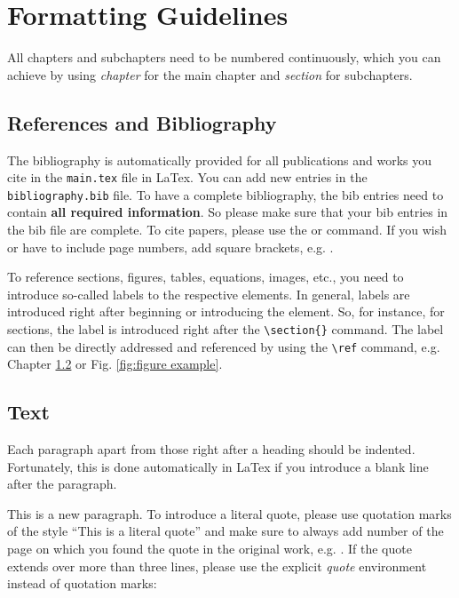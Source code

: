 \documentclass[a4paper,fontsize=12pt,listof=totoc,bibliography=totoc]{scrbook}
\begin{document}
\chapter{Formatting Guidelines}
All chapters and subchapters need to be numbered continuously, which you can achieve by using \textit{chapter} for the main chapter and \textit{section} for subchapters. 

\section{References and Bibliography}
The bibliography is automatically provided for all publications and works you cite in the \verb|main.tex| file in  LaTex. You can add new entries in the \verb|bibliography.bib| file. To have a complete bibliography, the bib entries  need to contain \textbf{all required information}. So please make sure that your bib entries in the bib file are complete.  To cite papers, please use the \citep{jurafskyspeech} or \citet{jurafskyspeech}command. If you wish or have to include page numbers, add square brackets, e.g. \citep[][123]{jurafskyspeech}. 

To reference sections, figures, tables, equations, images, etc., you need to introduce so-called labels to the respective elements. In general, labels are introduced right after beginning or introducing the element. So, for instance, for sections, the label is introduced right after the \verb|\section{}| command. The label can then be directly addressed and referenced by using the \verb|\ref| command, e.g. Chapter \ref{sec:format_text} or Fig. \ref{fig:figure example}.


\section{Text}
\label{sec:format_text}
Each paragraph apart from those right after a heading should be indented. Fortunately, this is done automatically in LaTex if you introduce a blank line after the paragraph. 

This is a new paragraph. To introduce a literal quote, please use quotation marks of the style ``This is a literal quote'' \citep{lamport94} and make sure to always add number of the page on which you found the quote in the original work, e.g. \citep[][20]{lamport94}. If the quote extends over more than three lines, please use the explicit \textit{quote} environment instead of quotation marks: 
\end{document}
